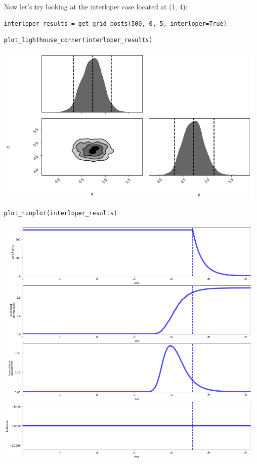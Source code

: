 \documentclass[11pt]{article}
\begin{document}
Now let's try looking at the interloper case located at (1, 4):

\begin{verbatim}
interloper_results = get_grid_posts(500, 0, 5, interloper=True)
\end{verbatim}


\begin{verbatim}
plot_lighthouse_corner(interloper_results)
\end{verbatim}

\includegraphics[width=.9\linewidth]{./obipy-resources/692fJU.png}

\begin{verbatim}
plot_runplot(interloper_results)
\end{verbatim}

\includegraphics[width=.9\linewidth]{./obipy-resources/692G2O.png}
\end{document}
